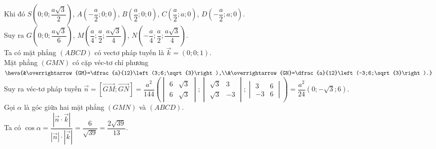 \begin{ex}
{\begin{center}
		\end{center}
		Khi đó
		$S\left(0;0;\dfrac{a\sqrt{3}}{2} \right)$, $A\left(-\dfrac{a}{2};0;0 \right)$, $B\left(\dfrac{a}{2};0;0 \right)$, $C\left(\dfrac{a}{2};a;0 \right)$, $D\left(-\dfrac{a}{2};a;0 \right)$.\\
		Suy ra $G\left(0;0;\dfrac{a\sqrt{3}}{6}\right)$, $M\left(\dfrac{a}{4};\dfrac{a}{2};\dfrac{a\sqrt{3}}{4}\right)$, $N\left(-\dfrac{a}{4};\dfrac{a}{2};\dfrac{a\sqrt{3}}{4}\right)$.\\
		Ta có mặt phẳng $(ABCD)$ có vectơ pháp tuyến là $\overrightarrow{k}=(0;0;1)$.\\
		Mặt phẳng $(GMN)$ có cặp véc-tơ chỉ phương
		$\heva{&\overrightarrow{GM}=\dfrac{a}{12}\left(3;6;\sqrt{3}\right),\\&\overrightarrow{GN}=\dfrac{a}{12}\left(-3;6;\sqrt{3}\right).}$\\
		Suy ra véc-tơ pháp tuyến $\overrightarrow{n}=\left[\overrightarrow{GM};\overrightarrow{GN}\right] 
		=\dfrac{a^2}{144}
		\left(
		\begin{vmatrix}
			6&\sqrt{3}\\6&\sqrt{3}
		\end{vmatrix};
		\begin{vmatrix}
			\sqrt{3}&3\\\sqrt{3}&-3
		\end{vmatrix};
		\begin{vmatrix}
			3&6\\-3&6
		\end{vmatrix}
		\right)
		=\dfrac{a^2}{24}\left(0;-\sqrt{3};6\right)$.\\
		Gọi $\alpha$ là góc giữa hai mặt phẳng $(GMN)$ và $(ABCD)$.\\
		Ta có
		$\cos\alpha=\dfrac{\left|\overrightarrow{n}\cdot\overrightarrow{k}\right|}{\left|{\overrightarrow{n}}\right|\cdot\left|{\overrightarrow{k}}\right|}=\dfrac{6}{\sqrt{39}}=\dfrac{2\sqrt{39}}{13}$.
	}
\end{ex}

